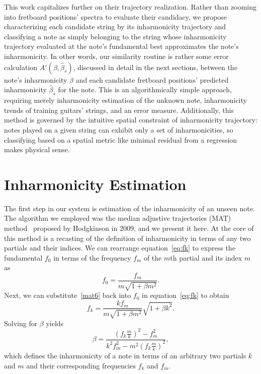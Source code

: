 \documentclass[12pt]{cmuthesis}
\begin{document}
This work capitalizes further on their trajectory realization. Rather than zooming into fretboard positions' spectra to evaluate their candidacy, we propose characterizing each candidate string by its inharmonicity trajectory and classifying a note as simply belonging to the string whose inharmonicity trajectory evaluated at the note's fundamental best approximates the note's inharmonicity. In other words, our similarity routine is rather some error calculation $A'(\beta,\hat{\beta}_s)$, discussed in detail in the next sections, between the note's inharmonicity $\beta$ and each candidate fretboard positions' predicted inharmonicity $\hat{\beta}_s$ for the note. This is an algorithmically simple approach, requiring merely inharmonicity estimation of the unknown note, inharmonicity trends of training guitars' strings, and an error measure. Additionally, this method is governed by the intuitive spatial constraint of inharmonicity trajectory: notes played on a given string can exhibit only a set of inharmonicities, so classifying based on a spatial metric like minimal residual from a regression makes physical sense.

\section{Inharmonicity Estimation}
The first step in our system is estimation of the inharmonicity of an unseen note. The algorithm we employed was the median adjustive trajectories (MAT) method~\cite{hodgkinson2009} proposed by Hodgkinson in 2009, and we present it here. At the core of this method is a recasting of the definition of inharmonicity in terms of any two partials and their indices. We can rearrange equation~\eqref{eq:fk} to express the fundamental $f_0$ in terms of the frequency $f_m$ of the $m$th partial and its index $m$ as
\begin{equation}
\label{mat6}
f_0 = \frac{f_m}{m\sqrt{1+\beta m^2}}.
\end{equation}
Next, we can substitute~\eqref{mat6} back into $f_0$ in equation~\eqref{eq:fk} to obtain
\begin{equation}
\label{mat7}
f_k = \frac{kf_m}{m\sqrt{1+\beta m^2}}\sqrt{1+\beta k^2}.
\end{equation}
Solving for $\beta$ yields
\begin{equation}
\label{mat8}
\beta = \frac{(f_k\frac{m}{k})^2-f_m^2}{k^2f_m^2-m^2(f_k\frac{m}{k})^2},
\end{equation}
which defines the inharmonicity of a note in terms of an arbitrary two partials $k$ and $m$ and their corresponding frequencies $f_k$ and $f_m$.
\end{document}
